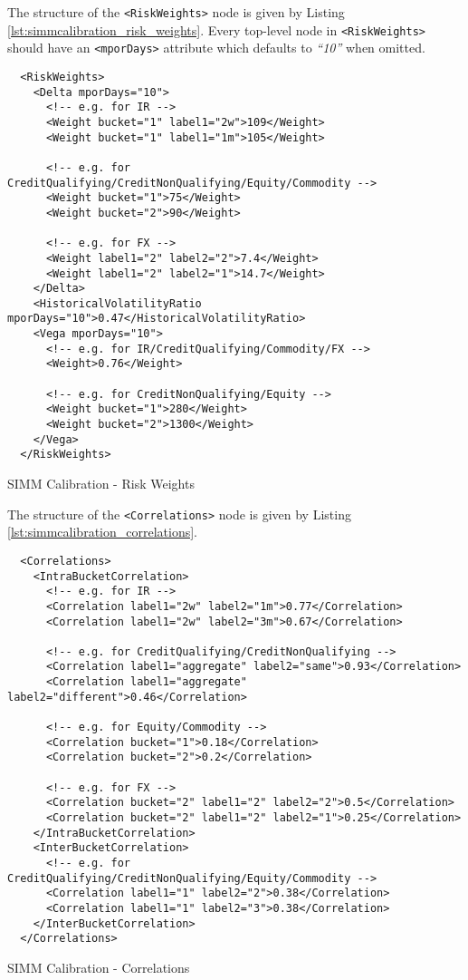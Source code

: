 The structure of the {\tt <RiskWeights>} node is given by Listing \ref{lst:simmcalibration_risk_weights}.
Every top-level node in {\tt <RiskWeights>} should have an {\tt <mporDays>} attribute which defaults to
\emph{``10''} when omitted.

\begin{listing}[H]
\begin{verbatim}
  <RiskWeights>
    <Delta mporDays="10">
      <!-- e.g. for IR -->
      <Weight bucket="1" label1="2w">109</Weight>
      <Weight bucket="1" label1="1m">105</Weight>

      <!-- e.g. for CreditQualifying/CreditNonQualifying/Equity/Commodity -->
      <Weight bucket="1">75</Weight>
      <Weight bucket="2">90</Weight>

      <!-- e.g. for FX -->
      <Weight label1="2" label2="2">7.4</Weight>
      <Weight label1="2" label2="1">14.7</Weight>
    </Delta>
    <HistoricalVolatilityRatio mporDays="10">0.47</HistoricalVolatilityRatio>
    <Vega mporDays="10">
      <!-- e.g. for IR/CreditQualifying/Commodity/FX -->
      <Weight>0.76</Weight>

      <!-- e.g. for CreditNonQualifying/Equity -->
      <Weight bucket="1">280</Weight>
      <Weight bucket="2">1300</Weight>
    </Vega>
  </RiskWeights>
\end{verbatim}
\caption{SIMM Calibration - Risk Weights}
\label{lst:simmcalibration_risk_weights}
\end{listing}

The structure of the {\tt <Correlations>} node is given by Listing \ref{lst:simmcalibration_correlations}.

\begin{listing}[H]
\begin{verbatim}
  <Correlations>
    <IntraBucketCorrelation>
      <!-- e.g. for IR -->
      <Correlation label1="2w" label2="1m">0.77</Correlation>
      <Correlation label1="2w" label2="3m">0.67</Correlation>

      <!-- e.g. for CreditQualifying/CreditNonQualifying -->
      <Correlation label1="aggregate" label2="same">0.93</Correlation>
      <Correlation label1="aggregate" label2="different">0.46</Correlation>

      <!-- e.g. for Equity/Commodity -->
      <Correlation bucket="1">0.18</Correlation>
      <Correlation bucket="2">0.2</Correlation>

      <!-- e.g. for FX -->
      <Correlation bucket="2" label1="2" label2="2">0.5</Correlation>
      <Correlation bucket="2" label1="2" label2="1">0.25</Correlation>
    </IntraBucketCorrelation>
    <InterBucketCorrelation>
      <!-- e.g. for CreditQualifying/CreditNonQualifying/Equity/Commodity -->
      <Correlation label1="1" label2="2">0.38</Correlation>
      <Correlation label1="1" label2="3">0.38</Correlation>
    </InterBucketCorrelation>
  </Correlations>
\end{verbatim}
\caption{SIMM Calibration - Correlations}
\label{lst:simmcalibration_correlations}
\end{listing}

